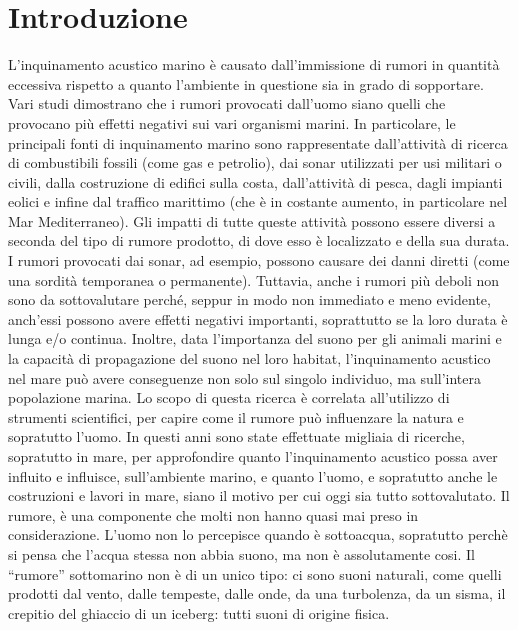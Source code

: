 
\chapter*{Introduzione}
L’inquinamento acustico marino è causato dall’immissione di rumori in quantità eccessiva rispetto a quanto l’ambiente in questione sia in grado di sopportare. 
Vari studi dimostrano che i rumori provocati dall’uomo siano quelli che provocano più effetti negativi sui vari organismi marini. 
In particolare, le principali fonti di inquinamento marino sono rappresentate dall’attività di ricerca di combustibili fossili (come gas e petrolio), dai sonar utilizzati per usi militari o civili, dalla costruzione di edifici sulla costa, dall’attività di pesca, dagli impianti eolici e infine dal traffico marittimo (che è in costante aumento, in particolare nel Mar Mediterraneo).
Gli impatti di tutte queste attività possono essere diversi a seconda del tipo di rumore prodotto, di dove esso è localizzato e della sua durata. 
I rumori provocati dai sonar, ad esempio, possono causare dei danni diretti (come una sordità temporanea o permanente). 
Tuttavia, anche i rumori più deboli non sono da sottovalutare perché, seppur in modo non immediato e meno evidente, anch’essi possono avere effetti negativi importanti, soprattutto se la loro durata è lunga e/o continua. 
Inoltre, data l’importanza del suono per gli animali marini e la capacità di propagazione del suono nel loro habitat, l’inquinamento acustico nel mare può avere conseguenze non solo sul singolo individuo, ma sull’intera popolazione marina.
Lo scopo di questa ricerca è correlata all'utilizzo di strumenti scientifici, per capire come il rumore può influenzare la natura e sopratutto l'uomo. 
In questi anni sono state effettuate migliaia di ricerche, sopratutto in mare, per approfondire quanto l'inquinamento acustico possa aver influito e influisce, sull'ambiente marino, e quanto l'uomo, e sopratutto anche le costruzioni e lavori in mare, siano il motivo per cui oggi sia tutto sottovalutato. 
Il rumore, è una componente che molti non hanno quasi mai preso in considerazione. 
L'uomo non lo percepisce quando è sottoacqua, sopratutto perchè si pensa che l'acqua stessa non abbia suono, ma non è assolutamente cosi. 
Il “rumore” sottomarino non è di un unico tipo: ci sono suoni naturali, come quelli prodotti dal vento, dalle tempeste, dalle onde, da una turbolenza, da un sisma, il crepitio del ghiaccio di un iceberg: tutti suoni di origine fisica. 
